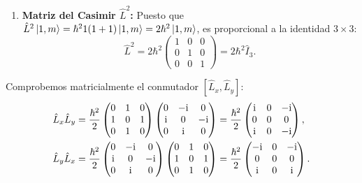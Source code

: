 \begin{enumerate}
\begin{align}
    \end{align}
    \item \textbf{Matriz del Casimir $\hat{L}^2$:}
    Puesto que $\hat{L}^2\left| 1, m \right\rangle = \hbar^2 1(1+1)\left| 1, m \right\rangle = 2\hbar^2\left| 1, m \right\rangle$, es proporcional a la identidad $3\times 3$:
    \begin{equation}
        \hat{L}^2 = 2\hbar^2 \begin{pmatrix} 1 & 0 & 0 \\ 0 & 1 & 0 \\ 0 & 0 & 1 \end{pmatrix} = 2\hbar^2 \hat{I}_3.
    \end{equation}
\end{enumerate}

\begin{alertabox}
    Comprobemos matricialmente el conmutador $[\hat{L}_x, \hat{L}_y]$:
    \begin{align}
        \hat{L}_x\hat{L}_y &= \frac{\hbar^2}{2}\begin{pmatrix} 0 & 1 & 0 \\ 1 & 0 & 1 \\ 0 & 1 & 0 \end{pmatrix}\begin{pmatrix} 0 & -\mathrm{i} & 0 \\ \mathrm{i} & 0 & -\mathrm{i} \\ 0 & \mathrm{i} & 0 \end{pmatrix} = \frac{\hbar^2}{2}\begin{pmatrix} \mathrm{i} & 0 & -\mathrm{i} \\ 0 & 0 & 0 \\ \mathrm{i} & 0 & -\mathrm{i} \end{pmatrix}, \\
        \hat{L}_y\hat{L}_x &= \frac{\hbar^2}{2}\begin{pmatrix} 0 & -\mathrm{i} & 0 \\ \mathrm{i} & 0 & -\mathrm{i} \\ 0 & \mathrm{i} & 0 \end{pmatrix}\begin{pmatrix} 0 & 1 & 0 \\ 1 & 0 & 1 \\ 0 & 1 & 0 \end{pmatrix} = \frac{\hbar^2}{2}\begin{pmatrix} -\mathrm{i} & 0 & -\mathrm{i} \\ 0 & 0 & 0 \\ \mathrm{i} & 0 & \mathrm{i} \end{pmatrix}.
    \end{align}

\end{alertabox}
